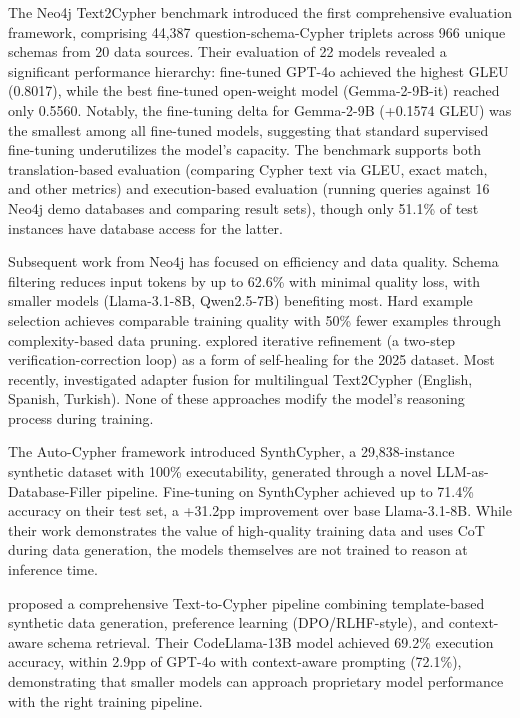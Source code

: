 \documentclass[11pt]{article}
\begin{document}
The Neo4j Text2Cypher benchmark \citep{ozsoy2025text2cypher} introduced the first comprehensive evaluation framework, comprising 44,387 question-schema-Cypher triplets across 966 unique schemas from 20 data sources. Their evaluation of 22 models revealed a significant performance hierarchy: fine-tuned GPT-4o achieved the highest GLEU (0.8017), while the best fine-tuned open-weight model (Gemma-2-9B-it) reached only 0.5560. Notably, the fine-tuning delta for Gemma-2-9B (+0.1574 GLEU) was the smallest among all fine-tuned models, suggesting that standard supervised fine-tuning underutilizes the model's capacity. The benchmark supports both translation-based evaluation (comparing Cypher text via GLEU, exact match, and other metrics) and execution-based evaluation (running queries against 16 Neo4j demo databases and comparing result sets), though only 51.1\% of test instances have database access for the latter.

Subsequent work from Neo4j has focused on efficiency and data quality. Schema filtering \citep{ozsoy2025schema} reduces input tokens by up to 62.6\% with minimal quality loss, with smaller models (Llama-3.1-8B, Qwen2.5-7B) benefiting most. Hard example selection \citep{ozsoy2025pruning} achieves comparable training quality with 50\% fewer examples through complexity-based data pruning. \citet{ozsoy2025iterative} explored iterative refinement (a two-step verification-correction loop) as a form of self-healing for the 2025 dataset. Most recently, \citet{ozsoy2026adapter} investigated adapter fusion for multilingual Text2Cypher (English, Spanish, Turkish). None of these approaches modify the model's reasoning process during training.

The Auto-Cypher framework \citep{tiwari2025autocypher} introduced SynthCypher, a 29,838-instance synthetic dataset with 100\% executability, generated through a novel LLM-as-Database-Filler pipeline. Fine-tuning on SynthCypher achieved up to 71.4\% accuracy on their test set, a +31.2pp improvement over base Llama-3.1-8B. While their work demonstrates the value of high-quality training data and uses CoT during data generation, the models themselves are not trained to reason at inference time.

\citet{yang2026pipeline} proposed a comprehensive Text-to-Cypher pipeline combining template-based synthetic data generation, preference learning (DPO/RLHF-style), and context-aware schema retrieval. Their CodeLlama-13B model achieved 69.2\% execution accuracy, within 2.9pp of GPT-4o with context-aware prompting (72.1\%), demonstrating that smaller models can approach proprietary model performance with the right training pipeline.
\end{document}
